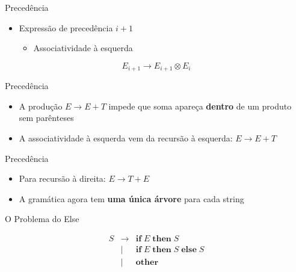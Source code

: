 \begin{frame}{Precedência}

    \begin{itemize}

        \item
        Expressão de precedência \(i+1\)

        \begin{itemize}

            \item
            Associatividade à esquerda
        \end{itemize}
    \end{itemize}

    \[
    E_{i + 1} \to E_{i + 1} \otimes E_i
    \]
\end{frame}

\begin{frame}{Precedência}

    \begin{itemize}

        \item
        A produção \(E \to E+T\) impede que soma apareça \textbf{dentro} de um
        produto sem parênteses
        \item
        A associatividade à esquerda vem da recursão à esquerda: \(E \to E+T\)
    \end{itemize}
\end{frame}

\begin{frame}{Precedência}

    \begin{itemize}

        \item
        Para recursão à direita: \(E \to T+E\)
        \item
        A gramática agora tem \textbf{uma única árvore} para cada string
    \end{itemize}
\end{frame}

\begin{frame}{O Problema do Else}

    \[\begin{array}{lcl}
    S &\to& \mathbf{if}\; E\; \mathbf{then}\; S \\
    &\mid& \mathbf{if}\; E\; \mathbf{then}\; S\; \mathbf{else}\; S \\
    &\mid& \mathbf{other}
\end{array}\]
\end{frame}

